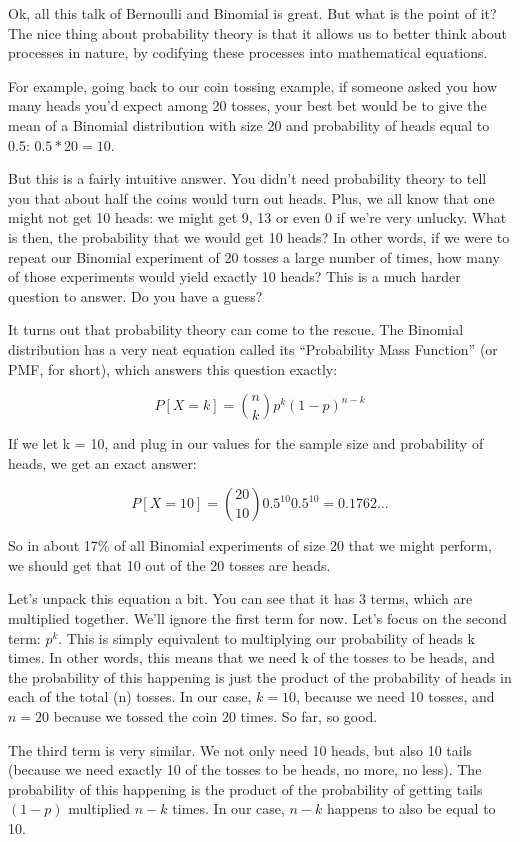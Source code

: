 \documentclass[
]{book}
\begin{document}
Ok, all this talk of Bernoulli and Binomial is great. But what is the point of it? The nice thing about probability theory is that it allows us to better think about processes in nature, by codifying these processes into mathematical equations.

For example, going back to our coin tossing example, if someone asked you how many heads you'd expect among 20 tosses, your best bet would be to give the mean of a Binomial distribution with size 20 and probability of heads equal to 0.5: \(0.5*20=10\).

But this is a fairly intuitive answer. You didn't need probability theory to tell you that about half the coins would turn out heads. Plus, we all know that one might not get 10 heads: we might get 9, 13 or even 0 if we're very unlucky. What is then, the probability that we would get 10 heads? In other words, if we were to repeat our Binomial experiment of 20 tosses a large number of times, how many of those experiments would yield exactly 10 heads? This is a much harder question to answer. Do you have a guess?

It turns out that probability theory can come to the rescue. The Binomial distribution has a very neat equation called its ``Probability Mass Function'' (or PMF, for short), which answers this question exactly:

\[P[ X = k ] = {n \choose k}p^{k}(1-p)^{n-k}\]

If we let k = 10, and plug in our values for the sample size and probability of heads, we get an exact answer:

\[P[ X = 10 ] = {20 \choose 10}0.5^{10}0.5^{10} = 0.1762...\]

So in about 17\% of all Binomial experiments of size 20 that we might perform, we should get that 10 out of the 20 tosses are heads.

Let's unpack this equation a bit. You can see that it has 3 terms, which are multiplied together. We'll ignore the first term for now. Let's focus on the second term: \(p^{k}\). This is simply equivalent to multiplying our probability of heads k times. In other words, this means that we need k of the tosses to be heads, and the probability of this happening is just the product of the probability of heads in each of the total (n) tosses. In our case, \(k=10\), because we need 10 tosses, and \(n=20\) because we tossed the coin 20 times. So far, so good.

The third term is very similar. We not only need 10 heads, but also 10 tails (because we need exactly 10 of the tosses to be heads, no more, no less). The probability of this happening is the product of the probability of getting tails \((1-p)\) multiplied \(n-k\) times. In our case, \(n-k\) happens to also be equal to 10.
\end{document}
